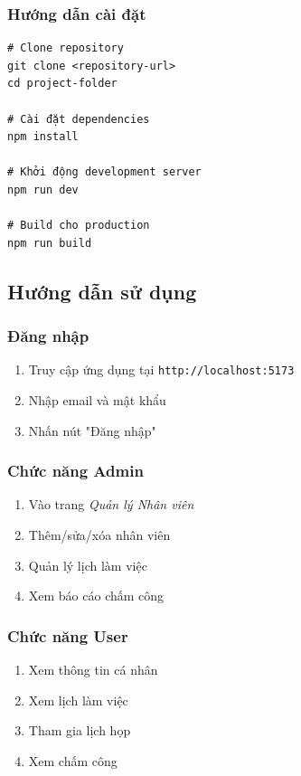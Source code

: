 \documentclass[12pt,a4paper]{report}
\begin{document}
\subsubsection{Hướng dẫn cài đặt}

\begin{lstlisting}[caption=Cài đặt hệ thống]
# Clone repository
git clone <repository-url>
cd project-folder

# Cài đặt dependencies
npm install

# Khởi động development server
npm run dev

# Build cho production
npm run build
\end{lstlisting}

\subsection{Hướng dẫn sử dụng}

\subsubsection{Đăng nhập}
\begin{enumerate}
    \item Truy cập ứng dụng tại \texttt{http://localhost:5173}
    \item Nhập email và mật khẩu
    \item Nhấn nút "Đăng nhập"
\end{enumerate}

\subsubsection{Chức năng Admin}
\begin{enumerate}
    \item Vào trang \textit{Quản lý Nhân viên}
    \item Thêm/sửa/xóa nhân viên
    \item Quản lý lịch làm việc
    \item Xem báo cáo chấm công
\end{enumerate}

\subsubsection{Chức năng User}
\begin{enumerate}
    \item Xem thông tin cá nhân
    \item Xem lịch làm việc
    \item Tham gia lịch họp
    \item Xem chấm công
\end{enumerate}
\end{document}
